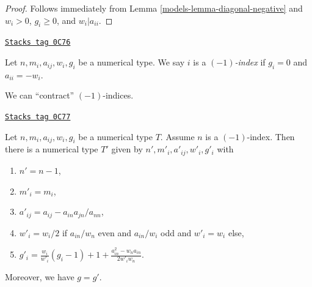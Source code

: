 \begin{proof}

Follows immediately from Lemma \ref{models-lemma-diagonal-negative} and
$w_i > 0$, $g_i \geq 0$, and $w_i | a_{ii}$.
\end{proof}

\begin{definition}
\label{models-definition-type-minus-one}
\href{https://stacks.math.columbia.edu/tag/0C76}{\texttt{Stacks tag 0C76}}

Let $n, m_i, a_{ij}, w_i, g_i$ be a numerical type.
We say $i$ is a {\it $(-1)$-index} if $g_i = 0$ and $a_{ii} = -w_i$.
\end{definition}

We can ``contract'' $(-1)$-indices.

\begin{lemma}[Contract]
\label{models-lemma-contract}
\href{https://stacks.math.columbia.edu/tag/0C77}{\texttt{Stacks tag 0C77}}

Let $n, m_i, a_{ij}, w_i, g_i$ be a numerical type $T$.
Assume $n$ is a $(-1)$-index. Then there is a numerical
type $T'$ given by $n', m'_i, a'_{ij}, w'_i, g'_i$ with
\begin{enumerate}
\item $n' = n - 1$,
\item $m'_i = m_i$,
\item $a'_{ij} = a_{ij} - a_{in}a_{jn}/a_{nn}$,
\item $w'_i = w_i/2$ if $a_{in}/w_n$ even and $a_{in}/w_i$ odd
and $w'_i = w_i$ else,
\item $g'_i =
\frac{w_i}{w'_i}(g_i - 1) + 1 + \frac{a_{in}^2 - w_na_{in}}{2w'_iw_n}$.
\end{enumerate}
Moreover, we have $g = g'$.
\end{lemma}

